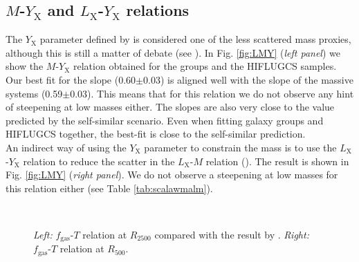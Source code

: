 \documentclass{aa} %
\begin{document}
\subsection{$M$-$Y_{\text{X}}$ and $L_{\text{X}}$-$Y_{\text{X}}$  relations}\label{MYrel}
The $Y_{\text{X}}$ parameter defined by \citet{2006ApJ...650..128K} is
considered one of the less scattered mass proxies, although this is
still a matter of debate (see \citealt{2010ApJ...715.1508S}). In
Fig. \ref{fig:LMY} ({\it left panel}) we show the
$M$-$Y_{\text{X}}$ relation obtained for the groups and the
HIFLUGCS samples. Our best fit for the slope (0.60$\pm$0.03) is aligned
well with the slope of the massive systems (0.59$\pm$0.03). This means that for this relation we do not observe any hint of steepening at low masses either.  
The slopes are also very close to the value predicted by the self-similar scenario. Even when fitting galaxy groups and HIFLUGCS together, the best-fit is close to the self-similar prediction.\\
An indirect way of using the $Y_{\text{X}}$ parameter to constrain the mass is to use the
$L_{\text{X}}$-$Y_{\text{X}}$ relation to reduce the scatter in the
$L_{\text{X}}$-$M$ relation (\citealt{2007ApJ...668..772M}). The
result is shown in Fig. \ref{fig:LMY} ({\it right panel}). We do not observe a steepening at low masses for this relation either (see Table \ref{tab:scalawmalm}).


\begin{figure*}[!t]
\begin{center}
\hbox{
}
\end{center}
\caption{{\it Left:} $f_{\text{gas}}$-$T$ relation at $R_{2500}$ compared with the result by \cite{2009ApJ...693.1142S}. {\it Right:} $f_{\text{gas}}$-$T$ relation at $R_{500}$.} 
\label{fig:fgas}
\end{figure*}
\end{document}
